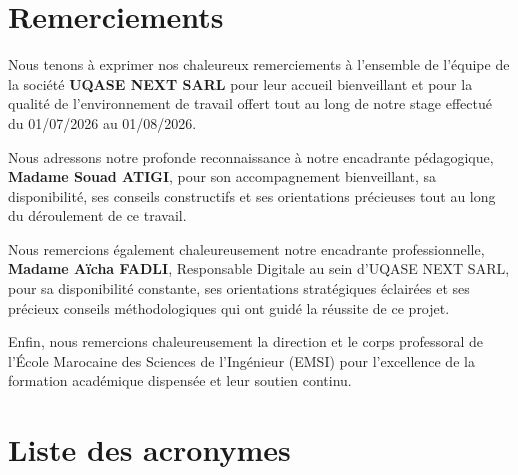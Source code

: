\documentclass[12pt,a4paper]{report}
\begin{document}
\newpage
\chapter*{Remerciements}
\thispagestyle{plain}

\vspace*{1.5cm}
Nous tenons à exprimer nos chaleureux remerciements à l'ensemble de l'équipe de la société \textbf{UQASE NEXT SARL} pour leur accueil bienveillant et pour la qualité de l'environnement de travail offert tout au long de notre stage effectué du 01/07/2026 au 01/08/2026.

Nous adressons notre profonde reconnaissance à notre encadrante pédagogique, \textbf{Madame Souad ATIGI}, pour son accompagnement bienveillant, sa disponibilité, ses conseils constructifs et ses orientations précieuses tout au long du déroulement de ce travail.

Nous remercions également chaleureusement notre encadrante professionnelle, \textbf{Madame Aïcha FADLI}, Responsable Digitale au sein d'UQASE NEXT SARL, pour sa disponibilité constante, ses orientations stratégiques éclairées et ses précieux conseils méthodologiques qui ont guidé la réussite de ce projet.

Enfin, nous remercions chaleureusement la direction et le corps professoral de l'École Marocaine des Sciences de l'Ingénieur (EMSI) pour l'excellence de la formation académique dispensée et leur soutien continu.

\newpage
\tableofcontents

\newpage
\listoffigures

\newpage
\listoftables

\newpage
\chapter*{Liste des acronymes}
\thispagestyle{plain}
\end{document}
